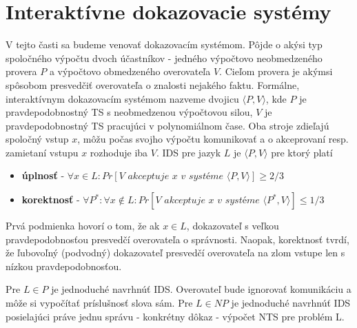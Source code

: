 \section{Interaktívne dokazovacie systémy}

V tejto časti sa budeme venovať dokazovacím systémom. Pôjde o akýsi
typ spoločného výpočtu dvoch účastníkov - jedného výpočtovo
neobmedzeného provera $P$ a výpočtovo obmedzeného overovateľa $V$.
Cieľom provera je akýmsi spôsobom presvedčiť overovateľa o znalosti
nejakého faktu.
Formálne,
interaktívnym dokazovacím systémom nazveme dvojicu
$\langle P,V \rangle$, kde $P$ je pravdepodobnostný TS s neobmedzenou výpočtovou silou,
$V$ je pravdepodobnostný TS pracujúci v polynomiálnom čase.
Oba stroje zdieľajú spoločný vstup $x$, môžu počas svojho výpočtu
komunikovať a o akceprovaní resp. zamietaní vstupu $x$ rozhoduje iba
$V$.
IDS pre jazyk $L$ je $\langle P,V \rangle$ pre ktorý platí
\begin{itemize}
\item {\bf úplnosť} - $\forall x \in L: 
    Pr[V\textit{ akceptuje } x \textit{ v systéme } 
        \langle P,V \rangle ] \ge 2/3$
\item {\bf korektnosť} - $\forall P^*: \forall x \not \in L: 
    Pr[V\textit{ akceptuje } x \textit{ v systéme } 
        \langle P^*,V \rangle ] \le 1/3$
\end{itemize}
Prvá podmienka hovorí o tom, že ak $x\in L$, dokazovateľ s veľkou
pravdepodobnosťou presvedčí overovateľa o správnosti.
Naopak, korektnosť tvrdí, že ľubovoľný (podvodný) dokazovateľ
presvedčí overovateľa na zlom vstupe len s nízkou pravdepodobnosťou.

\begin{komentar}
    Pre $L \in P$ je jednoduché navrhnúť IDS. Overovateľ bude ignorovať
    komunikáciu a môže si vypočítať príslušnosť slova sám.
    Pre $L \in NP$ je jednoduché navrhnúť IDS posielajúci práve jednu
    správu - konkrétny dôkaz - výpočet NTS pre problém L.
\end{komentar}

